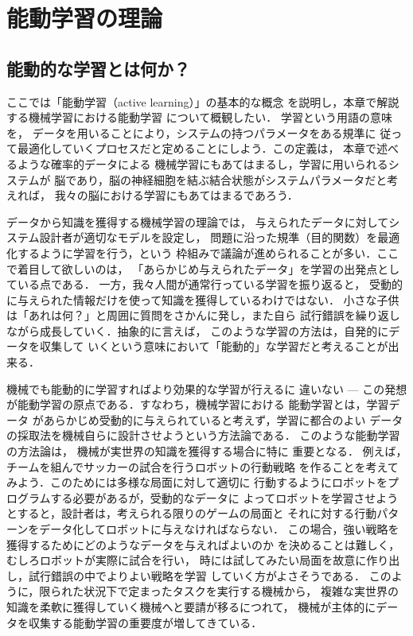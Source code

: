 \documentclass[master]{cimt}
\begin{document}
\chapter{能動学習の理論}

\section{能動的な学習とは何か？}

ここでは「能動学習（active learning）」の基本的な概念
を説明し，本章で解説する機械学習における能動学習
について概観したい．
学習という用語の意味を，
データを用いることにより，システムの持つパラメータをある規準に
従って最適化していくプロセスだと定めることにしよう．この定義は，
本章で述べるような確率的データによる
機械学習にもあてはまるし，学習に用いられるシステムが
脳であり，脳の神経細胞を結ぶ結合状態がシステムパラメータだと考えれば，
我々の脳における学習にもあてはまるであろう．

データから知識を獲得する機械学習の理論では，
与えられたデータに対してシステム設計者が適切なモデルを設定し，
問題に沿った規準（目的関数）を最適化するように学習を行う，という
枠組みで議論が進められることが多い．ここで着目して欲しいのは，
「あらかじめ与えられたデータ」を学習の出発点としている点である．
一方，我々人間が通常行っている学習を振り返ると，
受動的に与えられた情報だけを使って知識を獲得しているわけではない．
小さな子供は「あれは何？」と周囲に質問をさかんに発し，また自ら
試行錯誤を繰り返しながら成長していく．抽象的に言えば，
このような学習の方法は，自発的にデータを収集して
いくという意味において「能動的」な学習だと考えることが出来る．

機械でも能動的に学習すればより効果的な学習が行えるに
違いない --- この発想が能動学習の原点である．すなわち，機械学習における
能動学習とは，学習データ
があらかじめ受動的に与えられていると考えず，学習に都合のよい
データの採取法を機械自らに設計させようという方法論である．
このような能動学習の方法論は，
機械が実世界の知識を獲得する場合に特に
重要となる．
例えば，チームを組んでサッカーの試合を行うロボットの行動戦略
を作ることを考えてみよう．このためには多様な局面に対して適切に
行動するようにロボットをプログラムする必要があるが，受動的なデータに
よってロボットを学習させようとすると，設計者は，考えられる限りのゲームの局面と
それに対する行動パターンをデータ化してロボットに与えなければならない．
この場合，強い戦略を獲得するためにどのようなデータを与えればよいのか
を決めることは難しく，むしろロボットが実際に試合を行い，
時には試してみたい局面を故意に作り出し，試行錯誤の中でよりよい戦略を学習
していく方がよさそうである．
このように，限られた状況下で定まったタスクを実行する機械から，
複雑な実世界の知識を柔軟に獲得していく機械へと要請が移るにつれて，
機械が主体的にデータを収集する能動学習の重要度が増してきている．
\end{document}
